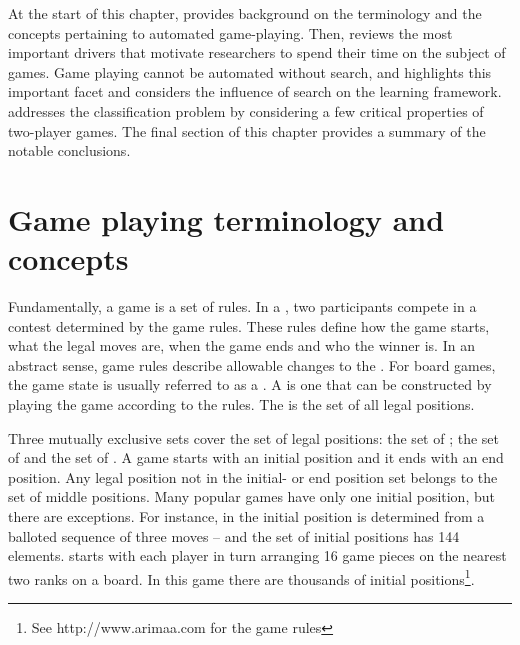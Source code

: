 At the start of this chapter,  provides background on the terminology and the concepts pertaining to automated game-playing. Then,   reviews the most important drivers that motivate researchers to spend their time on the subject of games. Game playing cannot be automated without search, and  highlights this important facet and considers the influence of search on the learning framework.  addresses the classification problem by considering a few critical properties of two-player games.  The final section of this chapter provides a summary of the notable conclusions.  

\section{Game playing terminology and concepts}
\label{sec:concepts-and-terms}
Fundamentally, a game is a set of rules.  In a , two participants compete in a contest determined by the game rules.  These rules define how the game starts, what the legal moves are,  when the game ends and who the winner is.  In an abstract sense,  game rules describe allowable changes to the .  For board games, the game state is usually referred to as a . A  is one that can be constructed by playing the game according to the rules.  The  is the set of all legal positions.   

Three mutually exclusive sets cover the set of legal positions: the set of ; the set of  and the set of .  A game starts with an initial position and it ends with an end position.  Any legal position not in the initial- or end position set belongs to the set of middle positions. Many popular games have only one initial position, but there are exceptions.  For instance, in   the initial position is determined from a balloted sequence of three moves \cite{schaeffer:solving} -- and the set of  initial positions has 144 elements.  starts with each player in turn arranging 16 game pieces on the nearest two ranks on a  board.  In this game there are thousands of initial positions\footnote{See http://www.arimaa.com for the  game rules}.  

